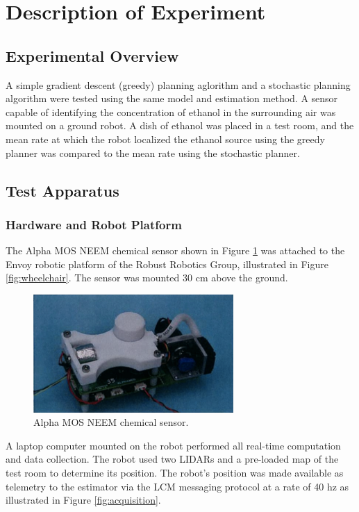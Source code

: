 \documentclass[submit, 12pt]{aiaa-pretty-modified}
\begin{document}
\section{Description of Experiment}
\subsection{Experimental Overview}
A simple gradient descent (greedy) planning aglorithm and a
stochastic planning algorithm were tested using the
same model and estimation method. A sensor capable of identifying the
concentration of ethanol in the surrounding air was mounted on a ground
robot. A dish of ethanol was placed in a test room, and the mean rate at which the robot localized the ethanol source
using the greedy planner was compared to the mean rate using the
stochastic planner.

\subsection{Test Apparatus}
\label{sec:design}
\subsubsection{Hardware and Robot Platform}

The Alpha MOS NEEM chemical sensor shown in Figure \ref{fig:sensor} was
attached to the Envoy robotic platform of the Robust Robotics Group, illustrated in Figure \ref{fig:wheelchair}.  The sensor was mounted
30 cm above the ground.


\begin{figure}
\begin{center}
\includegraphics[width=3in]{img/sensor.pdf}
\caption{Alpha MOS NEEM chemical sensor.}
\label{fig:sensor}
\end{center}
\end{figure}

A laptop computer
mounted on the robot performed all real-time computation and data
collection.  The robot used two LIDARs and a pre-loaded map of the
test room to determine its position.  The robot's position was made available
as telemetry to the estimator via the LCM messaging protocol at a rate
of 40 hz as
illustrated in Figure \ref{fig:acquisition}.
\end{document}
